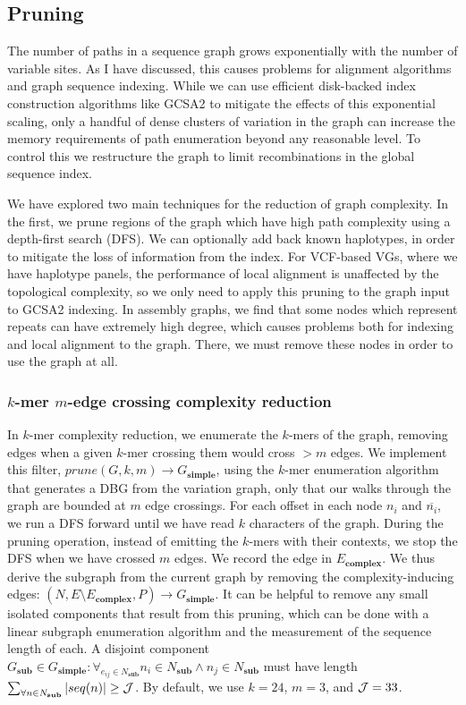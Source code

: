 \subsection{Pruning}

The number of paths in a sequence graph grows exponentially with the number of variable sites.
As I have discussed, this causes problems for alignment algorithms and graph sequence indexing.
While we can use efficient disk-backed index construction algorithms like GCSA2 to mitigate the effects of this exponential scaling, only a handful of dense clusters of variation in the graph can increase the memory requirements of path enumeration beyond any reasonable level.
To control this we restructure the graph to limit recombinations in the global sequence index.

We have explored two main techniques for the reduction of graph complexity.
In the first, we prune regions of the graph which have high path complexity using a depth-first search (DFS).
We can optionally add back known haplotypes, in order to mitigate the loss of information from the index.
For VCF-based VGs, where we have haplotype panels, the performance of local alignment is unaffected by the topological complexity, so we only need to apply this pruning to the graph input to GCSA2 indexing.
In assembly graphs, we find that some nodes which represent repeats can have extremely high degree, which causes problems both for indexing and local alignment to the graph.
There, we must remove these nodes in order to use the graph at all.

\subsubsection{$k$-mer $m$-edge crossing complexity reduction}

In $k$-mer complexity reduction, we enumerate the $k$-mers of the graph, removing edges when a given $k$-mer crossing them would cross $> m$ edges.
We implement this filter, $prune(G, k, m) \to G_\textbf{simple}$, using the $k$-mer enumeration algorithm that generates a DBG from the variation graph, only that our walks through the graph are bounded at $m$ edge crossings.
For each offset in each node $n_i$ and $\overline{n_i}$, we run a DFS forward until we have read $k$ characters of the graph.
During the pruning operation, instead of emitting the $k$-mers with their contexts, we stop the DFS when we have crossed $m$ edges.
We record the edge in $E_\textbf{complex}$. %
We thus derive the subgraph from the current graph by removing the complexity-inducing edges: $(N, E \setminus E_\textbf{complex}, P) \to G_\textbf{simple}$.
It can be helpful to remove any small isolated components that result from this pruning, which can be done with a linear subgraph enumeration algorithm and the measurement of the sequence length of each.
A disjoint component $G_\textbf{sub} \in G_\textbf{simple} : \forall_{e_{ij} \in N_\textbf{sub}} n_i \in N_\textbf{sub} \land n_j \in N_\textbf{sub}$ must have length $\sum_{\forall n \in N_\textbf{sub}} |seq(n)| \geq {\cal J}$.
By default, we use $k=24$, $m=3$, and ${\cal J}=33$.

